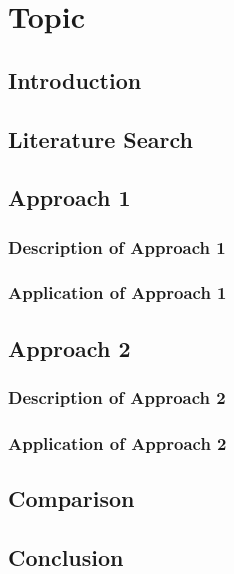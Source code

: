 \chapter{Topic}

\section{Introduction}


\section{Literature Search}

\section{Approach 1}

\subsection{Description of Approach 1}

\subsection{Application of Approach 1}

\section{Approach 2}

\subsection{Description of Approach 2}

\subsection{Application of Approach 2}

\section{Comparison}


\section{Conclusion}

